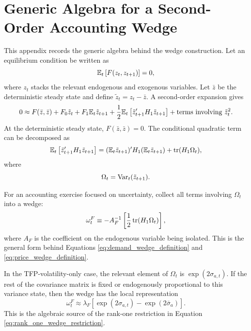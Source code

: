 \section{Generic Algebra for a Second-Order Accounting Wedge}

This appendix records the generic algebra behind the wedge construction. Let an
equilibrium condition be written as
\begin{equation}
    \mathbb{E}_t
    \left[
        F(z_t,z_{t+1})
    \right]
    =
    0,
    \label{eq:generic_equilibrium_condition}
\end{equation}
where \(z_t\) stacks the relevant endogenous and exogenous variables. Let
\(\bar{z}\) be the deterministic steady state and define
\(\tilde{z}_t=z_t-\bar{z}\). A second-order expansion gives
\begin{equation}
    0
    \approx
    F(\bar{z},\bar{z})
    +
    F_0 \tilde{z}_t
    +
    F_1 \mathbb{E}_t \tilde{z}_{t+1}
    +
    \frac{1}{2}
    \mathbb{E}_t
    \left[
        \tilde{z}_{t+1}'
        H_1
        \tilde{z}_{t+1}
    \right]
    +
    \text{terms involving } \tilde{z}_t^2.
    \label{eq:generic_second_order_expansion}
\end{equation}
At the deterministic steady state, \(F(\bar{z},\bar{z})=0\). The conditional
quadratic term can be decomposed as
\begin{equation}
    \mathbb{E}_t
    \left[
        \tilde{z}_{t+1}'
        H_1
        \tilde{z}_{t+1}
    \right]
    =
    (\mathbb{E}_t\tilde{z}_{t+1})'
    H_1
    (\mathbb{E}_t\tilde{z}_{t+1})
    +
    \operatorname{tr}(H_1\Omega_t),
    \label{eq:mean_variance_decomposition}
\end{equation}
where
\begin{equation}
    \Omega_t
    =
    \operatorname{Var}_t(\tilde{z}_{t+1}).
    \label{eq:omega_covariance}
\end{equation}

For an accounting exercise focused on uncertainty, collect all terms involving
\(\Omega_t\) into a wedge:
\begin{equation}
    \omega^F_t
    \equiv
    -A_F^{-1}
    \left[
        \frac{1}{2}\operatorname{tr}(H_1\Omega_t)
    \right],
    \label{eq:generic_wedge}
\end{equation}
where \(A_F\) is the coefficient on the endogenous variable being isolated. This
is the general form behind Equations \eqref{eq:demand_wedge_definition} and
\eqref{eq:price_wedge_definition}.

In the TFP-volatility-only case, the relevant element of \(\Omega_t\) is
\(\exp(2\sigma_{a,t})\). If the rest of the covariance matrix is fixed or
endogenously proportional to this variance state, then the wedge has the local
representation
\begin{equation}
    \omega^F_t
    \approx
    \lambda_F
    \left[
        \exp(2\sigma_{a,t})-\exp(2\bar{\sigma}_a)
    \right].
    \label{eq:generic_rank_one_wedge}
\end{equation}
This is the algebraic source of the rank-one restriction in Equation
\eqref{eq:rank_one_wedge_restriction}.
